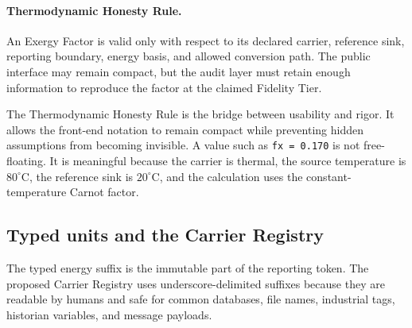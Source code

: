 \documentclass[11pt]{article}
\newcommand{\degC}{^{\circ}\mathrm{C}}
\begin{document}
\paragraph{Thermodynamic Honesty Rule.} An Exergy Factor is valid only with respect to its declared carrier, reference sink, reporting boundary, energy basis, and allowed conversion path. The public interface may remain compact, but the audit layer must retain enough information to reproduce the factor at the claimed Fidelity Tier.

The Thermodynamic Honesty Rule is the bridge between usability and rigor. It allows the front-end notation to remain compact while preventing hidden assumptions from becoming invisible. A value such as \texttt{fx = 0.170} is not free-floating. It is meaningful because the carrier is thermal, the source temperature is $80\degC$, the reference sink is $20\degC$, and the calculation uses the constant-temperature Carnot factor.

\subsection{Typed units and the Carrier Registry}

The typed energy suffix is the immutable part of the reporting token. The proposed Carrier Registry uses underscore-delimited suffixes because they are readable by humans and safe for common databases, file names, industrial tags, historian variables, and message payloads.
\end{document}
